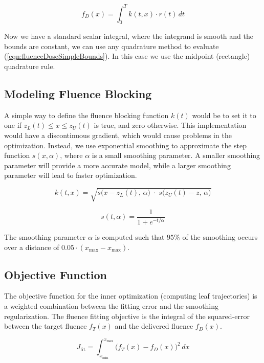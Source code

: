 \begin{equation}
  f_D(x) = \int_0^T \! k(t, x) \cdot r(t) \, dt
  \label{eqn:fluenceDoseSimpleBounds}
\end{equation}

Now we have a standard scalar integral, where the integrand is smooth and the
bounds are constant, we can use any quadrature method to evaluate (\ref{eqn:fluenceDoseSimpleBounds}).
In this case we use the midpoint (rectangle) quadrature rule.

\subsection{Modeling Fluence Blocking}
\label{sec:modelingFluenceBlocking}

A simple way to define the fluence blocking function $k(t)$
would be to set it to one if $z_L(t) \leq x \leq z_U(t)$
is true, and zero otherwise.
This implementation would have a discontinuous gradient, which would cause problems in the optimization.
Instead, we use exponential smoothing to approximate the step function $s(x,\alpha)$,
where $\alpha$ is a small smoothing parameter.
A smaller smoothing parameter will provide a more accurate model,
while a larger smoothing parameter will lead to faster optimization.

\begin{equation}
  k(t, x) = \sqrt{s\big(x - z_L(t), \, \alpha\big) \; \cdot \; s\big(z_U(t) - z, \, \alpha\big)}
\end{equation}

\begin{equation}
  s(t, \alpha) = \frac{1}{1 + e^{-t/\alpha}}
\end{equation}

The smoothing parameter $\alpha$ is computed such that $95\%$ of the smoothing occurs over a
distance of $0.05 \cdot (x_\text{max} - x_\text{max})$.

\subsection{Objective Function}

The objective function for the inner optimization (computing leaf trajectories)
is a weighted combination between the fitting error and the smoothing regularization.
The fluence fitting objective is the integral of the squared-error
between the target fluence $f_T(x)$ and the delivered fluence $f_D(x)$.

\begin{equation}
  J_\text{fit} = \int_{x_\text{min}}^{x_\text{max}} \! \big( f_T(x) - f_D(x) \big)^2 \,dx
\end{equation}

